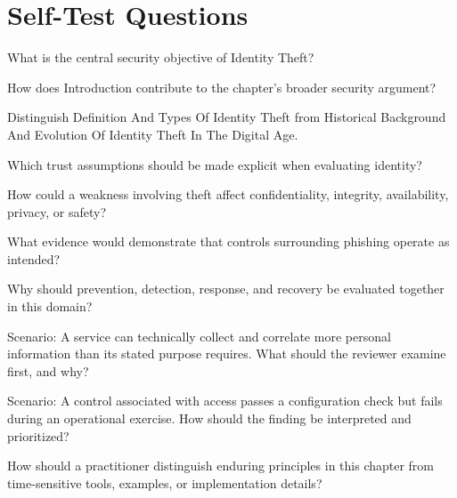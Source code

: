\documentclass[11pt,letterpaper]{article}
\begin{document}
\section*{Self-Test Questions}
\begin{CornellRecallList}
\item What is the central security objective of Identity Theft?
\item How does Introduction contribute to the chapter's broader security argument?
\item Distinguish Definition And Types Of Identity Theft from Historical Background And Evolution Of Identity Theft In The Digital Age.
\item Which trust assumptions should be made explicit when evaluating identity?
\item How could a weakness involving theft affect confidentiality, integrity, availability, privacy, or safety?
\item What evidence would demonstrate that controls surrounding phishing operate as intended?
\item Why should prevention, detection, response, and recovery be evaluated together in this domain?
\item Scenario: A service can technically collect and correlate more personal information than its stated purpose requires. What should the reviewer examine first, and why?
\item Scenario: A control associated with access passes a configuration check but fails during an operational exercise. How should the finding be interpreted and prioritized?
\item How should a practitioner distinguish enduring principles in this chapter from time-sensitive tools, examples, or implementation details?
\end{CornellRecallList}
\end{document}
